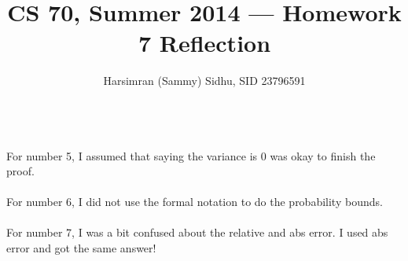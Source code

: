 \documentclass[11pt,letterpaper]{article}
\title{CS 70, Summer 2014 --- Homework 7 Reflection} %
\author{Harsimran (Sammy) Sidhu, SID 23796591} %
\begin{document}
\maketitle
~\\
For number 5, I assumed that saying the variance is 0 was okay to finish the proof.\\\\
For number 6, I did not use the formal notation to do the probability bounds.\\\\
For number 7, I was a bit confused about the relative and abs error. I used abs error and got the same answer!
\end{document}
